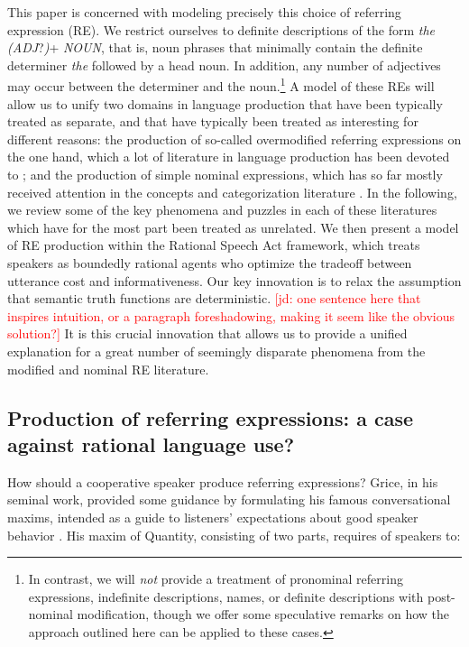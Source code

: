 \documentclass[11pt]{article}
\newcommand{\jd}[1]{\textcolor{Red}{[jd: #1]}}
\begin{document}
This paper is concerned with  modeling precisely this choice of referring expression (RE). We restrict ourselves to definite descriptions of the form \emph{the (ADJ}?\emph{)}+ \emph{NOUN}, that is, noun phrases that minimally contain the definite determiner \emph{the} followed by a head noun. In addition, any number of adjectives may occur between the determiner and the noun.\footnote{In contrast, we will \emph{not} provide a treatment of pronominal referring expressions, indefinite descriptions, names, or definite descriptions with post-nominal modification, though we offer some speculative remarks on how the approach outlined here can be applied to these cases. } A model of these REs will allow us to unify two domains in language production that have been typically treated as separate, and that have typically been treated as interesting for different reasons: the production of so-called overmodified referring expressions on the one hand, which a lot of literature in language production has been devoted to \cite{herrmann1976, Pechmann1989, nadig2002,  Maes2004, Engelhardt2006, Arts2011, Koolen2011, rubiofernandez2016}; and the production of simple nominal expressions, which has so far mostly received attention in the concepts and categorization literature \cite{Rosch1973, Rosch1976}. In the following, we review some of the key phenomena and puzzles in each of these literatures which have for the most part been treated as unrelated. We then present a model of RE production within the Rational Speech Act \cite{frank2012} framework, which treats speakers as boundedly rational agents who optimize the tradeoff between utterance cost and  informativeness. Our key innovation is to relax the assumption that semantic truth functions are deterministic. \jd{one sentence here that inspires intuition, or a paragraph foreshadowing, making it seem like the obvious solution?} It is this crucial innovation that allows us to provide a unified explanation for a great number of seemingly disparate phenomena from the modified and nominal RE literature.

\subsection{Production of referring expressions: a case against rational language use?}

How should a cooperative speaker produce referring expressions? Grice, in his seminal work, provided some guidance by formulating his famous conversational maxims, intended as a guide to listeners' expectations about good speaker behavior \cite{grice1975}. His maxim of Quantity, consisting of two parts, requires of speakers to:
\end{document}
